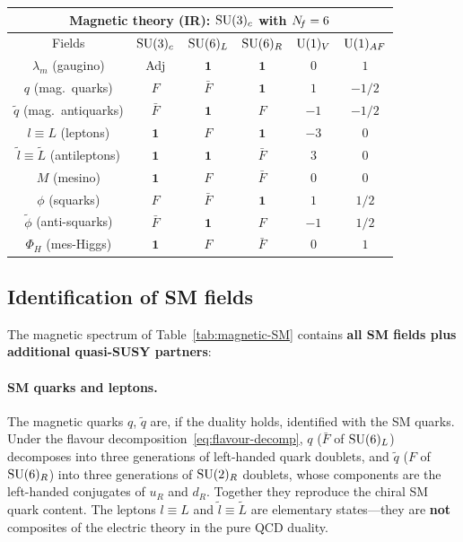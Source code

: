 \documentclass[11pt,a4paper]{article}
\begin{document}
\begin{center}
\renewcommand{\arraystretch}{1.3}
\begin{tabular}{c c c c c c}
\toprule
\multicolumn{6}{c}{\textbf{Magnetic theory (IR): $\mathrm{SU}(3)_c$ with $N_{\!f} = 6$}} \\
\midrule
Fields & $\mathrm{SU}(3)_c$ & $\mathrm{SU}(6)_L$ & $\mathrm{SU}(6)_R$ & $\mathrm{U}(1)_V$ & $\mathrm{U}(1)_{AF}$ \\
\midrule
$\lambda_m$ (gaugino) & Adj & $\mathbf{1}$ & $\mathbf{1}$ & $0$ & $1$ \\
$q$ (mag.\ quarks)    & $F$ & $\bar{F}$ & $\mathbf{1}$ & $1$  & $-1/2$ \\
$\widetilde{q}$ (mag.\ antiquarks) & $\bar{F}$ & $\mathbf{1}$ & $F$ & $-1$ & $-1/2$ \\
$l \equiv L$ (leptons)  & $\mathbf{1}$ & $F$ & $\mathbf{1}$ & $-3$ & $0$ \\
$\widetilde{l} \equiv \widetilde{L}$ (antileptons) & $\mathbf{1}$ & $\mathbf{1}$ & $\bar{F}$ & $3$ & $0$ \\
$M$ (mesino)  & $\mathbf{1}$ & $F$ & $\bar{F}$ & $0$ & $0$ \\
$\phi$ (squarks) & $F$ & $\bar{F}$ & $\mathbf{1}$ & $1$ & $1/2$ \\
$\widetilde{\phi}$ (anti-squarks) & $\bar{F}$ & $\mathbf{1}$ & $F$ & $-1$ & $1/2$ \\
$\Phi_H$ (mes-Higgs) & $\mathbf{1}$ & $F$ & $\bar{F}$ & $0$ & $1$ \\
\bottomrule
\end{tabular}
\label{tab:magnetic-SM}
\end{center}

\subsection{Identification of SM fields}

The magnetic spectrum of Table~\ref{tab:magnetic-SM} contains
\textbf{all SM fields plus additional quasi-SUSY partners}:

\paragraph{SM quarks and leptons.}
The magnetic quarks $q$, $\widetilde{q}$ are, if the duality holds, identified with the SM
quarks.  Under the flavour decomposition~\eqref{eq:flavour-decomp},
$q$ ($\bar{F}$ of $\mathrm{SU}(6)_L$) decomposes into three generations of
left-handed quark doublets, and $\widetilde{q}$ ($F$ of $\mathrm{SU}(6)_R$)
into three generations of $\mathrm{SU}(2)_R$ doublets, whose components are the
left-handed conjugates of $u_R$ and $d_R$.  Together they reproduce the
chiral SM quark content.  The leptons $l \equiv L$ and
$\widetilde{l} \equiv \widetilde{L}$ are elementary states---they are
\textbf{not} composites of the electric theory in the pure QCD duality.
\end{document}
